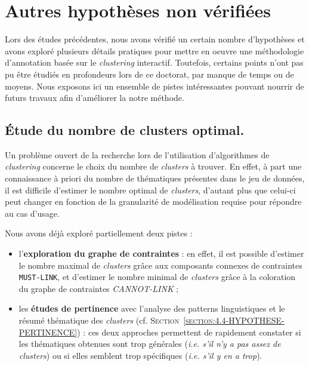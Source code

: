 \section{Autres hypothèses non vérifiées}
\label{section:4.7-HYPOTHESES-NON-VERIFIEES}

	Lors des études précédentes, nous avons vérifié un certain nombre d'hypothèses et avons exploré plusieurs détails pratiques pour mettre en oeuvre une méthodologie d'annotation basée sur le \textit{clustering} interactif.
	Toutefois, certains points n'ont pas pu être étudiés en profondeurs lors de ce doctorat, par manque de temps ou de moyens.
	Nous exposons ici un ensemble de pistes intéressantes pouvant nourrir de futurs travaux afin d'améliorer la notre méthode.
	
	
	\subsection{Étude du nombre de clusters optimal.}
	\label{section:4.7.1-HYPOTHESES-NON-VERIFIEES-NOMBRE-CLUSTERS}
	
		Un problème ouvert de la recherche lors de l'utilisation d'algorithmes de \textit{clustering} concerne le choix du nombre de \textit{clusters} à trouver.
		En effet, à part une connaissance à priori du nombre de thématiques présentes dans le jeu de données, il est difficile d'estimer le nombre optimal de \textit{clusters}, d'autant plus que celui-ci peut changer en fonction de la granularité de modélisation requise pour répondre au cas d'usage.
		
		Nous avons déjà exploré partiellement deux pistes :
		\begin{itemize}
			\item l'\textbf{exploration du graphe de contraintes} : en effet, il est possible d'estimer le nombre maximal de \textit{clusters} grâce aux composants connexes de contraintes \texttt{MUST-LINK}, et d'estimer le nombre minimal de \textit{clusters} grâce à la coloration du graphe de contraintes \textit{CANNOT-LINK} ;
			\item les \textbf{études de pertinence} avec l'analyse des patterns linguistiques et le résumé thématique des \textit{clusters} (cf. \textsc{Section~\ref{section:4.4-HYPOTHESE-PERTINENCE}}) : ces deux approches permettent de rapidement constater si les thématiques obtenues sont trop générales (\textit{i.e. s'il n'y a pas assez de clusters}) ou si elles semblent trop spécifiques (\textit{i.e. s'il y en a trop}).
		\end{itemize}
		
